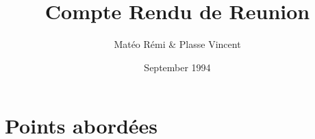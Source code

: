 \documentclass{article}
\title{Compte Rendu de Reunion}
\author{Matéo Rémi \& Plasse Vincent}
\date{September 1994}
\begin{document}
\maketitle

\section{Points abordées}
      
\end{document}
